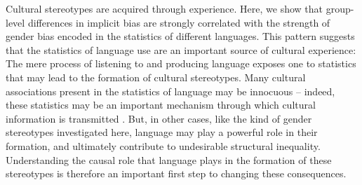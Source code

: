 \documentclass[9pt,twocolumn,twoside]{pnas-new}
\begin{document}
Cultural stereotypes are acquired through experience. Here, we show that
group-level differences in implicit bias are strongly correlated with
the strength of gender bias encoded in the statistics of different
languages. This pattern suggests that the statistics of language use are
an important source of cultural experience: The mere process of
listening to and producing language exposes one to statistics that may
lead to the formation of cultural stereotypes. Many cultural
associations present in the statistics of language may be innocuous --
indeed, these statistics may be an important mechanism through which
cultural information is transmitted \cite{lupyan2017wordsascues}. But, in
other cases, like the kind of gender stereotypes investigated here,
language may play a powerful role in their formation, and ultimately
contribute to undesirable structural inequality. Understanding the causal role that language plays in the
formation of these stereotypes is therefore an important first step to
changing these consequences.
\end{document}
